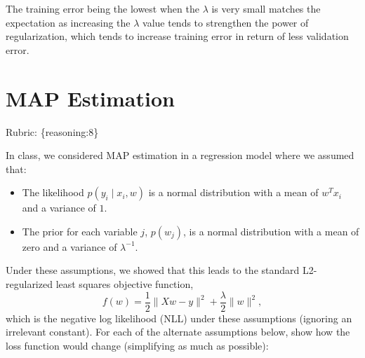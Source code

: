 \documentclass{article}
\def\rubric#1{\gre{Rubric: \{#1\}}}{}
\def\blu#1{{\color{blu}#1}}
\def\gre#1{{\color{gre}#1}}
\def\red#1{{\color{red}#1}}
\def\norm#1{\|#1\|}
\def\items#1{\begin{itemize}#1\end{itemize}}
\begin{document}
\red{The training error being the lowest when the $\lambda$ is very small matches the expectation as increasing the $\lambda$ value tends to strengthen the power of regularization, which tends to increase training error in return of less validation error. }


\section{MAP Estimation}
\rubric{reasoning:8}

In class, we considered MAP estimation in a regression model where we assumed that:
\items{
\item The likelihood $p(y_i \mid x_i, w)$ is a normal distribution with a mean of $w^Tx_i$ and a variance of $1$.
\item The prior for each variable $j$, $p(w_j)$, is a normal distribution with a mean of zero and a variance of $\lambda^{-1}$.
}
Under these assumptions, we showed that this leads to the standard L2-regularized least squares objective function,
\[
f(w) = \frac{1}{2}\norm{Xw - y}^2 + \frac \lambda 2 \norm{w}^2,
\]
which is the negative log likelihood (NLL) under these assumptions (ignoring an irrelevant constant).
\blu{For each of the alternate assumptions below, show how the loss function would change} (simplifying as much as possible):
\end{document}
